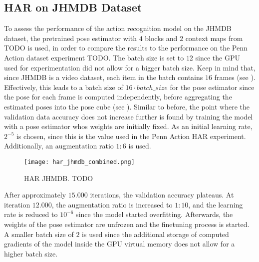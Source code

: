 

\subsection{HAR on JHMDB Dataset}
To assess the performance of the action recognition model on the JHMDB dataset, the pretrained pose estimator with $4$ blocks and $2$ context maps from TODO is used, in order to compare the results to the performance on the Penn Action dataset experiment TODO.
The batch size is set to $12$ since the GPU used for experimentation did not allow for a bigger batch size.
Keep in mind that, since JHMDB is a video dataset, each item in the batch contains $16$ frames (see ).
Effectively, this leads to a batch size of $16 \cdot batch\_size$ for the pose estimator since the pose for each frame is computed independently, before aggregating the estimated poses into the pose cube (see ).
Similar to before, the point where the validation data accuracy does not increase further is found by training the model with a pose estimator whos weights are initially fixed.
As an initial learning rate, $2^{-5}$ is chosen, since this is the value used in the Penn Action HAR experiment.
Additionally, an augmentation ratio $1:6$ is used.


\begin{figure}[htb!]
    \centering
    \texttt{[image: har\_jhmdb\_combined.png]}
    \caption{HAR JHMDB. TODO}
    \label{fig:har_jhmdb_combined}
\end{figure}


After approximately $15.000$ iterations, the validation accuracy plateaus.
At iteration $12.000$, the augmentation ratio is increased to $1:10$, and the learning rate is reduced to $10^{-6}$ since the model started overfitting.
Afterwards, the weights of the pose estimator are unfrozen and the finetuning process is started.
A smaller batch size of $2$ is used since the additional storage of computed gradients of the model inside the GPU virtual memory does not allow for a higher batch size.


